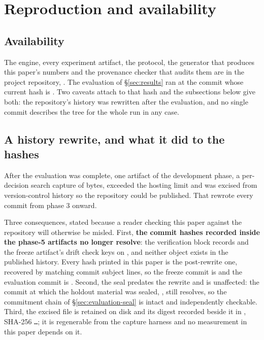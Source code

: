 \section{Reproduction and availability}
\label{app:repro}

\subsection*{Availability}

The engine, every experiment artifact, the protocol, the generator that produces this paper's
numbers and the provenance checker that audits them are in the project repository,
. The evaluation of \S\ref{sec:results}
ran at the commit whose current hash is \texttt{\vsevenBzeroCommit{}}. Two caveats attach to that
hash and the subsections below give both: the repository's history was rewritten after the
evaluation, and no single commit describes the tree for the whole run in any case.

\subsection*{A history rewrite, and what it did to the hashes}

After the evaluation was complete, one artifact of the development phase, a per-decision search
capture of \vsevenKfiveBytes{} bytes, exceeded the hosting limit and was excised from version-control
history so the repository could be published. That rewrote every commit from phase 3 onward.

Three consequences, stated because a reader checking this paper against the repository will otherwise
be misled. First, \textbf{the commit hashes recorded inside the phase-5 artifacts no longer resolve}:
the verification block records \texttt{\vsevenBzeroCommitRecorded{}} and the freeze artifact's drift
check keys on \texttt{\vsevenFreezeCommitRecorded{}}, and neither object exists in the published
history. Every hash printed in this paper is the post-rewrite one, recovered by matching commit
subject lines, so the freeze commit is \texttt{\vsevenFreezeCommit{}} and the evaluation commit is
\texttt{\vsevenBzeroCommit{}}. Second, the seal predates the rewrite and is unaffected: the commit at
which the holdout material was sealed, \texttt{\vsevenSealCommit{}}, still resolves, so the
commitment chain of \S\ref{sec:evaluation-seal} is intact and independently checkable. Third, the
excised file is retained on disk and its digest recorded beside it in
, SHA-256
\texttt{\vsevenKfiveDigest{}\ldots}; it is regenerable from the capture harness and no measurement in
this paper depends on it.

